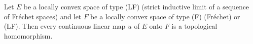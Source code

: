 Let $E$ be a locally convex space of type (LF) (strict inductive limit of a sequence of Fréchet spaces) and let $F$ be a locally convex space of type (F) (Fréchet) or (LF). Then every continuous linear map $u$ of $E$ onto $F$ is a topological homomorphism.
